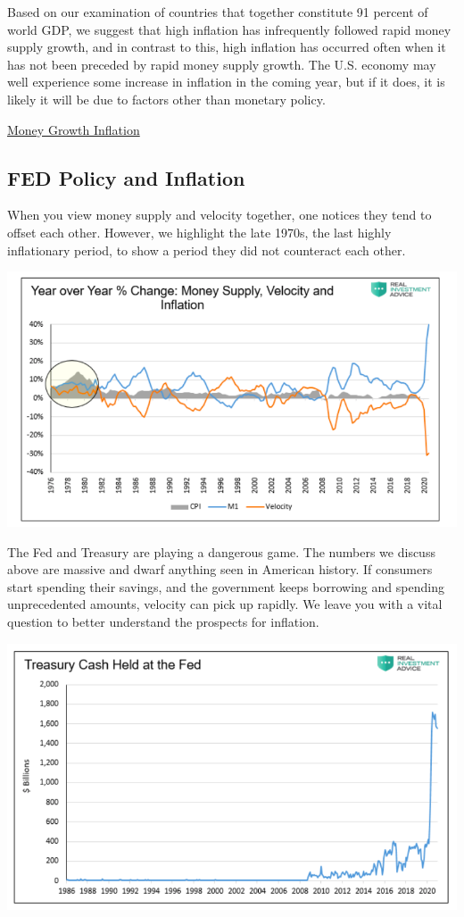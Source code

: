 \documentclass[
]{book}
\begin{document}
Based on our examination of countries that together constitute 91 percent of world GDP, we suggest that high inflation has infrequently followed rapid money supply growth, and in contrast to this, high inflation has occurred often when it has not been preceded by rapid money supply growth. The U.S. economy may well experience some increase in inflation in the coming year, but if it does, it is likely it will be due to factors other than monetary policy.

\href{https://evonomics.com/moneysupply/}{Money Growth Inflation}

\hypertarget{fed-policy-and-inflation}{%
\subsection{FED Policy and Inflation}\label{fed-policy-and-inflation}}

When you view money supply and velocity together, one notices they tend to offset each other. However, we highlight the late 1970s, the last highly inflationary period, to show a period they did not counteract each other.

\includegraphics{fig/money_and_inflation_US.png}

The Fed and Treasury are playing a dangerous game. The numbers we discuss above are massive and dwarf anything seen in American history. If consumers start spending their savings, and the government keeps borrowing and spending unprecedented amounts, velocity can pick up rapidly. We leave you with a vital question to better understand the prospects for inflation.

\includegraphics{fig/Treasury_cash_at_FED.png}
\end{document}
